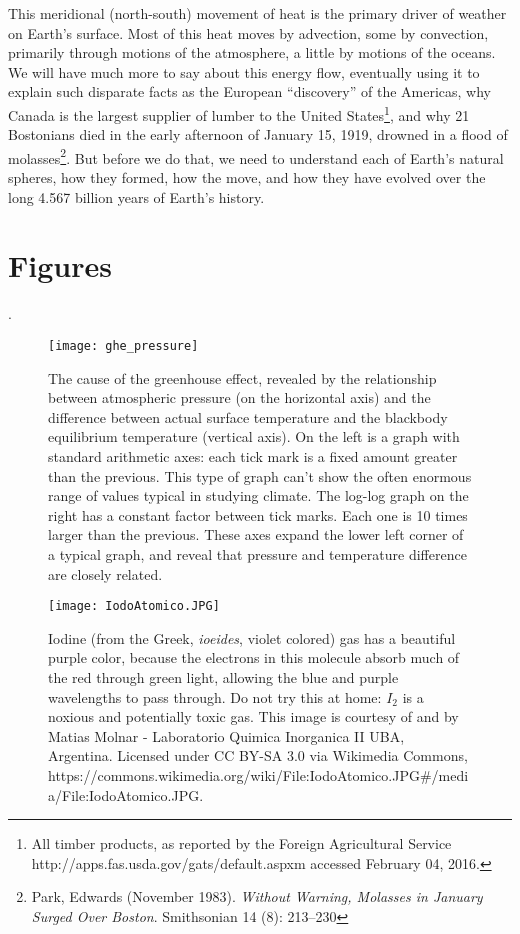 \documentclass[amstex,12pt]{book}
\begin{document}
This meridional (north-south) movement of heat is the primary driver of weather on Earth's surface. Most of this heat moves by advection, some by convection, primarily through motions of the atmosphere, a little by motions of the oceans. We will have much more to say about this energy flow, eventually using it to explain such disparate facts as the European ``discovery'' of the Americas, why Canada is the largest supplier of lumber to the United States\footnote{All timber products, as reported by the Foreign Agricultural Service  http://apps.fas.usda.gov/gats/default.aspxm accessed February 04, 2016.}, and why 21 Bostonians died in the early afternoon of January 15, 1919, drowned in a flood of molasses\footnote{Park, Edwards (November 1983). \textit{Without Warning, Molasses in January Surged Over Boston}. Smithsonian 14 (8): 213–230}. But before we do that, we need to understand each of Earth's natural spheres, how they formed, how the move, and how they have evolved over the long 4.567 billion years of Earth's history. 

\section{Figures}
.
\newpage

\begin{figure}[p]
\centering
\texttt{[image: ghe\_pressure]}%
\caption{The cause of the greenhouse effect, revealed by the relationship between atmospheric pressure (on the horizontal axis) and the difference between actual surface temperature and the blackbody equilibrium temperature (vertical axis). On the left is a graph with standard arithmetic axes: each tick mark is a fixed amount greater than the previous. This type of graph can't show the often enormous range of values typical in studying climate. The log-log graph on the right has a constant factor between tick marks. Each one is 10 times larger than the previous. These axes expand the lower left corner of a typical graph, and reveal that pressure and temperature difference are closely related. }   
\label{fig:tghe_P}
\end{figure}

\begin{figure}[p]
\centering
\texttt{[image: IodoAtomico.JPG]}
\caption{Iodine (from the Greek, \textit{ioeides}, violet colored) gas has a beautiful purple color, because the electrons in this molecule absorb much of the red through green light, allowing the blue and purple wavelengths to pass through. Do not try this at home: $I_2$ is a noxious and potentially toxic gas. This image is courtesy of and by Matias Molnar - Laboratorio Quimica Inorganica II UBA, Argentina. Licensed under CC BY-SA 3.0 via Wikimedia Commons,  https://commons.wikimedia.org/wiki/File:IodoAtomico.JPG\#/media/File:IodoAtomico.JPG.}   
\label{fig:iodine}
\end{figure}
\end{document}
